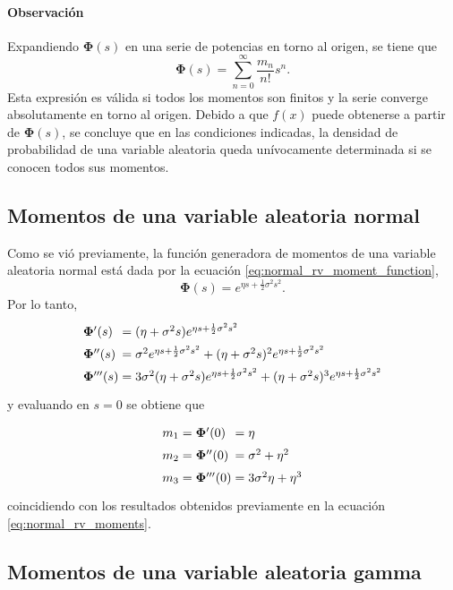 \documentclass[a4paper]{report}
\newcommand{\Phibf}{\mathbf{\Phi}}
\begin{document}
\paragraph{Observación} Expandiendo \(\Phibf(s)\) en una serie de potencias en torno al origen, se tiene que
\[
 \Phibf(s)=\sum_{n=0}^{\infty}\frac{m_n}{n!}s^n.
\]
Esta expresión es válida si todos los momentos son finitos y la serie converge absolutamente en torno al origen. Debido a que \(f(x)\) puede obtenerse a partir de \(\Phibf(s)\), se concluye que en las condiciones indicadas, la densidad de probabilidad de una variable aleatoria queda unívocamente determinada si se conocen todos sus momentos.

\subsection{Momentos de una variable aleatoria normal}

Como se vió previamente, la función generadora de momentos de una variable aleatoria normal está dada por la ecuación \ref{eq:normal_rv_moment_function},
\[
 \Phibf(s)=e^{\eta s+\frac{1}{2}\sigma^2s^2}.
\]
Por lo tanto,
\[\arraycolsep=1.4pt\def\arraystretch{1.5}
 \begin{array}{lll}
 \Phibf'(s)&=&(\eta+\sigma^2s)e^{\eta s+\frac{1}{2}\sigma^2s^2}\\
 \Phibf''(s)&=&\sigma^2e^{\eta s+\frac{1}{2}\sigma^2s^2}+(\eta+\sigma^2s)^2e^{\eta s+\frac{1}{2}\sigma^2s^2}\\
 \Phibf'''(s)&=&3\sigma^2(\eta+\sigma^2s)e^{\eta s+\frac{1}{2}\sigma^2s^2}+(\eta+\sigma^2s)^3e^{\eta s+\frac{1}{2}\sigma^2s^2}
 \end{array}
\]
y evaluando en \(s=0\) se obtiene que
\[\arraycolsep=1.4pt\def\arraystretch{1.5}
 \begin{array}{lllll}
 m_1&=&\Phibf'(0)&=&\eta\\
 m_2&=&\Phibf''(0)&=&\sigma^2+\eta^2\\
 m_3&=&\Phibf'''(0)&=&3\sigma^2\eta+\eta^3
 \end{array}
\]
coincidiendo con los resultados obtenidos previamente en la ecuación \ref{eq:normal_rv_moments}.

\subsection{Momentos de una variable aleatoria gamma}
\end{document}

